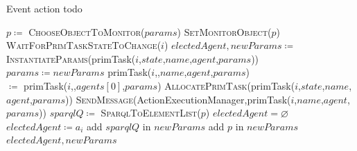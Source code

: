 \documentclass[a4paper,11pt,twoside]{StyleThese}
\begin{document}
\begin{algorithm}[!htb]
	\caption{Event action todo}
	\label{chap2:algo:todo}
	\begin{algorithmic}
	\State $p \coloneqq$ \textsc{ChooseObjectToMonitor($params$)}
	\State \textsc{SetMonitorObject($p$)}
	\State \textsc{WaitForPrimTaskStateToChange($i$)}
		\State $electedAgent,newParams\coloneqq$
		\\\hfill \textsc{InstantiateParams}(primTask($i$,$state$,$name$,$agent$,$params$))
		\State $params \coloneqq newParams$
		\EndIf
			\State primTask($i$,,$name$,$agent$,$params$) 
			\\\hfill $\coloneqq$ primTask($i$,,$agents[0]$,$params$)
		\Else
			\State \textsc{AllocatePrimTask}(primTask($i$,$state$,$name$,$agent$,$params$))
			 \State \textsc{SendMessage}(ActionExecutionManager,primTask($i$,$name$,$agent$,$params$))
			 \EndIf
		\EndIf
	\EndIf
	\EndFunction
	\Statex
		\State $sparqlQ \coloneqq$ \textsc{SparqlToElementList($p$)} 
		\State $electedAgent = \varnothing$
			\State $electedAgent \coloneqq a_i$
		\EndIf
		\State add $sparqlQ$ in $newParams$
	\Else
		\State add $p$ in $newParams$
	\EndIf
	\EndFor
	\State \Return $electedAgent,newParams$
	\EndFunction
\end{algorithmic}
\end{algorithm}
\end{document}
